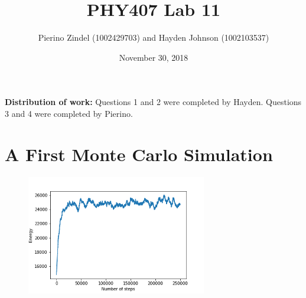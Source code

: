\documentclass{article}
\title{PHY407 Lab 11}
\author{Pierino Zindel (1002429703) and Hayden Johnson (1002103537)}
\date{November 30, 2018}
\begin{document}
\maketitle

\noindent \textbf{Distribution of work:} Questions 1 and 2 were completed by Hayden. Questions 3 and 4 were completed by Pierino.

\section{A First Monte Carlo Simulation}

\begin{figure}[H]
	\centering
	\includegraphics[width=0.7\textwidth]{../images/q1a_energy.png}
\end{figure}
\end{document}
